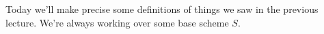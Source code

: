 
Today we'll make precise some definitions of things we saw in the previous lecture. We're always working over some base scheme $S$.


